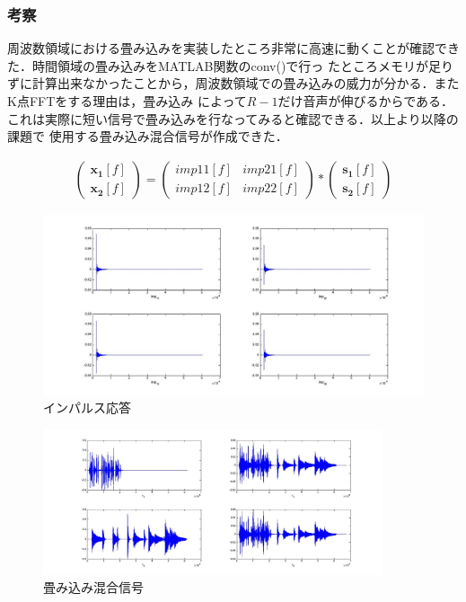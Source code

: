 \documentclass[a4j]{jarticle}
\begin{document}
\subsubsection{考察}
周波数領域における畳み込みを実装したところ非常に高速に動くことが確認できた．時間領域の畳み込みをMATLAB関数のconv()で行っ
たところメモリが足りずに計算出来なかったことから，周波数領域での畳み込みの威力が分かる．またK点FFTをする理由は，畳み込み
によって$R-1$だけ音声が伸びるからである．これは実際に短い信号で畳み込みを行なってみると確認できる．以上より以降の課題で
使用する畳み込み混合信号が作成できた．

\begin{eqnarray}
\left(
 \begin{array}{cc}
  \bm{x_1}[f]\\
  \bm{x_2}[f]
 \end{array}
\right)
=
\left(
 \begin{array}{cc}
  imp11[f] & imp21[f]\\
  imp12[f] & imp22[f]
 \end{array}
\right)
*
\left(
 \begin{array}{cc}
  \bm{s_1}[f]\\
  \bm{s_2}[f]
 \end{array}
\right)
\end{eqnarray}

\begin{figure}[htb]
 \begin{center}
  \includegraphics[width=13cm, clip, bb=0 0 1254 595]{pic/ex2.jpg}
  \caption{インパルス応答}
  \label{ex2}
 \end{center}
\end{figure}

\newpage
\begin{figure}[htb]
 \begin{center}
  \includegraphics[width=10cm, clip, bb=0 0 1360 584]{pic/ex1.jpg}
  \caption{畳み込み混合信号}
  \label{ex1}
 \end{center}
\end{figure}
\end{document}
